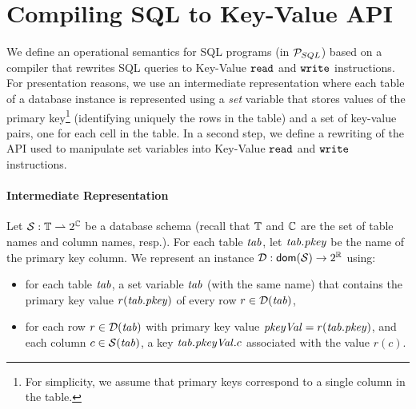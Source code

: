 
\section{Compiling SQL to Key-Value API}
\label{sec:SQL-to-KV}

We define an operational semantics for SQL programs (in $\mathcal{P}_{SQL}$) based on a compiler that rewrites SQL queries to Key-Value $\mathtt{read}$ and $\mathtt{write}$ instructions. For presentation reasons, we use an intermediate representation where each table of a database instance is represented using a \emph{set} variable that stores values of the primary key\footnote{For simplicity, we assume that primary keys correspond to a single column in the table.} (identifying uniquely the rows in the table) and a set of key-value pairs, one for each cell in the table. In a second step, we define a rewriting of the API used to manipulate set variables into Key-Value $\mathtt{read}$ and $\mathtt{write}$ instructions.

\paragraph{Intermediate Representation}

Let $\mathcal{S}:\mathbb{T}\rightharpoonup 2^{\mathbb{C}}$ be a database schema (recall that $\mathbb{T}$ and $\mathbb{C}$ are the set of table names and column names, resp.). For each table $\mathit{tab}$, let $\mathit{tab}.\mathit{pkey}$ be the name of the primary key column. We represent an instance $\mathcal{D}: \mathsf{dom}(\mathcal{S})\rightarrow 2^{\mathbb{R}}$ using:
\begin{itemize}
	\item for each table $\mathit{tab}$, a set variable $\mathit{tab}$ (with the same name) that contains the primary key value $r(\mathit{tab}.\mathit{pkey})$ of every row $r\in \mathcal{D}(\mathit{tab})$, 
	\item for each row $r\in \mathcal{D}(\mathit{tab})$ with primary key value $\mathit{pkeyVal} = r(\mathit{tab}.\mathit{pkey})$, and each column $c\in \mathcal{S}(\mathit{tab})$, a key $\mathit{tab}.\mathit{pkeyVal}.c$ associated with the value $r(c)$.
\end{itemize}


